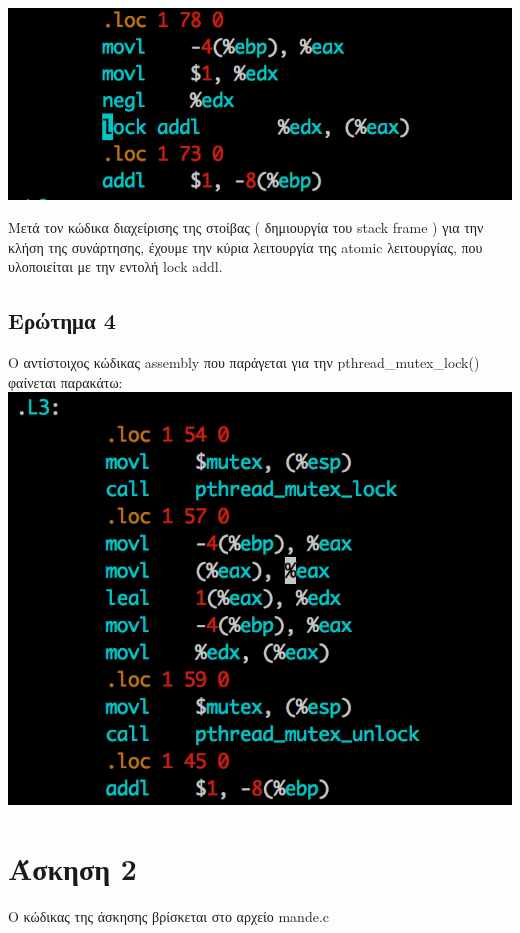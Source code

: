 \documentclass[12pt]{article}
\begin{document}
\includegraphics[scale=0.5]{ask3-atomic.png}

Μετά τον κώδικα διαχείρισης της στοίβας ( δημιουργία του \textlatin{stack frame} ) για την κλήση της συνάρτησης, έχουμε την κύρια λειτουργία της \textlatin{atomic} λειτουργίας, που υλοποιείται με την εντολή \textlatin{lock addl}.

\subsection*{Ερώτημα 4}
Ο αντίστοιχος κώδικας \textlatin{assembly} που παράγεται για την \textlatin{pthread\_mutex\_lock()} φαίνεται παρακάτω: \\
\includegraphics[scale=0.5]{ask3-mutex.png}


\section*{Άσκηση 2}

Ο κώδικας της άσκησης βρίσκεται στο αρχείο \textlatin{mande.c}
\end{document}
